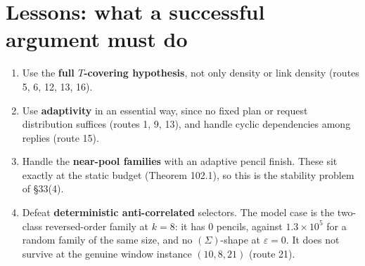 \documentclass[11pt]{article}
\begin{document}
\section*{Lessons: what a successful argument must do}
\begin{enumerate}[leftmargin=*]
\item Use the \textbf{full $T$-covering hypothesis}, not only density or link density (routes 5, 6, 12, 13, 16).
\item Use \textbf{adaptivity} in an essential way, since no fixed plan or request distribution suffices (routes 1, 9,
13), and handle cyclic dependencies among replies (route 15).
\item Handle the \textbf{near-pool families} with an adaptive pencil finish. These sit exactly at the static budget
(Theorem 102.1), so this is the stability problem of \S33(4).
\item Defeat \textbf{deterministic anti-correlated} selectors. The model case is the two-class reversed-order family at
$k=8$: it has 0 pencils, against $1.3\times10^5$ for a random family of the same size, and no $(\Sigma)$-shape at $\varepsilon=0$. It does not survive at the genuine window
instance $(10,8,21)$ (route 21).
\end{enumerate}
\end{document}
